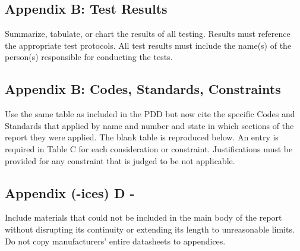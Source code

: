 \documentclass[12pt,a4paper]{report}
\begin{document}
\subsection{Appendix B: Test Results}
Summarize, tabulate, or chart the results of all testing. Results must reference the appropriate test protocols.  All test results must include the name(s) of the person(s) responsible for conducting the tests.\\

\subsection{Appendix B: Codes, Standards, Constraints}
Use the same table as included in the PDD but now cite the specific Codes and Standards that applied by name and number and state in which sections of the report they were applied.  The blank table is reproduced below.  An entry is required in Table C for each consideration or constraint.  Justifications must be provided for any constraint that is judged to be not applicable.\\

\subsection{Appendix (-ices) D -} 
Include materials that could not be included in the main body of the report without disrupting its continuity or extending its length to unreasonable limits.  Do not copy manufacturers' entire datasheets to appendices.  
\end{document}

